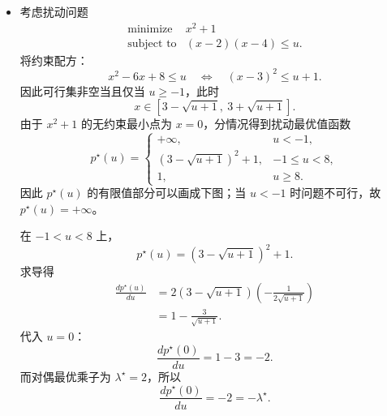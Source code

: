\documentclass[12pt,a4paper]{article}
\begin{document}
\begin{itemize}
  \item[(d)] 考虑扰动问题
  \[
    \begin{array}{ll}
      \text{minimize} & x^2+1\\
      \text{subject to} & (x-2)(x-4)\leq u.
    \end{array}
  \]
  将约束配方：
  \[
    x^2-6x+8\leq u
    \quad\Longleftrightarrow\quad
    (x-3)^2\leq u+1.
  \]
  因此可行集非空当且仅当 $u\geq -1$，此时
  \[
    x\in\left[3-\sqrt{u+1},\ 3+\sqrt{u+1}\right].
  \]
  由于 $x^2+1$ 的无约束最小点为 $x=0$，分情况得到扰动最优值函数
  \[
    p^\star(u)=
    \begin{cases}
      +\infty, & u<-1,\\[0.3em]
      \left(3-\sqrt{u+1}\right)^2+1, & -1\leq u<8,\\[0.3em]
      1, & u\geq 8.
    \end{cases}
  \]
  因此 $p^\star(u)$ 的有限值部分可以画成下图；当 $u<-1$ 时问题不可行，故 $p^\star(u)=+\infty$。

  \begin{center}
  \end{center}


  在 $-1<u<8$ 上，
  \[
    p^\star(u)=\left(3-\sqrt{u+1}\right)^2+1.
  \]
  求导得
  \[
  \begin{aligned}
    \frac{dp^\star(u)}{du}
    &=2\left(3-\sqrt{u+1}\right)
      \left(-\frac{1}{2\sqrt{u+1}}\right)\\
    &=1-\frac{3}{\sqrt{u+1}}.
  \end{aligned}
  \]
  代入 $u=0$：
  \[
    \frac{dp^\star(0)}{du}=1-3=-2.
  \]
  而对偶最优乘子为 $\lambda^\star=2$，所以
  \[
    \boxed{\frac{dp^\star(0)}{du}=-2=-\lambda^\star.}
  \]

\end{itemize}
\end{document}
